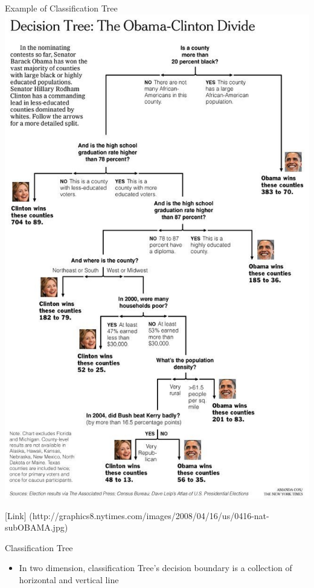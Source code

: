 \documentclass[
  ignorenonframetext,
]{beamer}
\providecommand{\tightlist}{%
  \setlength{\itemsep}{0pt}\setlength{\parskip}{0pt}}\usepackage{longtable,booktabs,array}
\begin{document}
\begin{frame}{Example of Classification Tree}
\label{example-of-classification-tree}
\includegraphics{images/tree2.jpg}

{[}Link{]}
(http://graphics8.nytimes.com/images/2008/04/16/us/0416-nat-subOBAMA.jpg)
\end{frame}

\begin{frame}{Classification Tree}
\label{classification-tree}
\begin{itemize}
\tightlist
\item
  In two dimension, classification Tree's decision boundary is a
  collection of horizontal and vertical line
\end{itemize}
\end{frame}
\end{document}
